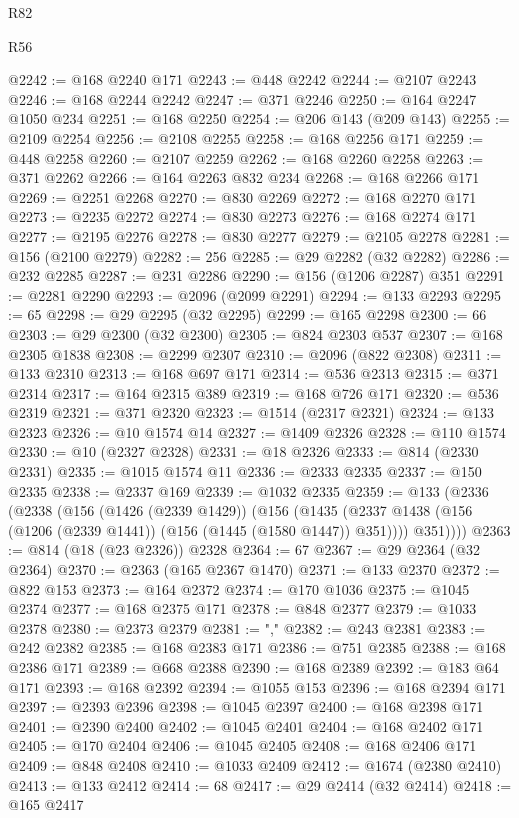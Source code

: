 \begin{lexlean}{R82}
\begin{lexlean}{R56}
\begin{coremodule}
{{{{{{{{{{{{{{{{{{{{{{{{{{{{{{{{{{{{{{{{{{{{{{{{{{{{{{{{{{{{{{{{{{{{{{{{{{{{{{{{{{{{{{{{{{{{{{{{{{{{{{{{{{{{{{{{{{{{{{{{{{{{{{{{{{{{{{{{{{{{{{{{{{{{{{{{{{{{{{{{{{{{{{{{{{{{{{{{{{{{{{{{{{{{{{{{{{{{{{{{{{{{{{{{{{{@2242 := @168 @2240 @171
@2243 := @448 @2242
@2244 := @2107 @2243
@2246 := @168 @2244 @2242
@2247 := @371 @2246
@2250 := @164 @2247 @1050 @234
@2251 := @168 @2250
@2254 := @206 @143 (@209 @143)
@2255 := @2109 @2254
@2256 := @2108 @2255
@2258 := @168 @2256 @171
@2259 := @448 @2258
@2260 := @2107 @2259
@2262 := @168 @2260 @2258
@2263 := @371 @2262
@2266 := @164 @2263 @832 @234
@2268 := @168 @2266 @171
@2269 := @2251 @2268
@2270 := @830 @2269
@2272 := @168 @2270 @171
@2273 := @2235 @2272
@2274 := @830 @2273
@2276 := @168 @2274 @171
@2277 := @2195 @2276
@2278 := @830 @2277
@2279 := @2105 @2278
@2281 := @156 (@2100 @2279)
@2282 := 256
@2285 := @29 @2282 (@32 @2282)
@2286 := @232 @2285
@2287 := @231 @2286
@2290 := @156 (@1206 @2287) @351
@2291 := @2281 @2290
@2293 := @2096 (@2099 @2291)
@2294 := @133 @2293
@2295 := 65
@2298 := @29 @2295 (@32 @2295)
@2299 := @165 @2298
@2300 := 66
@2303 := @29 @2300 (@32 @2300)
@2305 := @824 @2303 @537
@2307 := @168 @2305 @1838
@2308 := @2299 @2307
@2310 := @2096 (@822 @2308)
@2311 := @133 @2310
@2313 := @168 @697 @171
@2314 := @536 @2313
@2315 := @371 @2314
@2317 := @164 @2315 @389
@2319 := @168 @726 @171
@2320 := @536 @2319
@2321 := @371 @2320
@2323 := @1514 (@2317 @2321)
@2324 := @133 @2323
@2326 := @10 @1574 @14
@2327 := @1409 @2326
@2328 := @110 @1574
@2330 := @10 (@2327 @2328)
@2331 := @18 @2326
@2333 := @814 (@2330 @2331)
@2335 := @1015 @1574 @11
@2336 := @2333 @2335
@2337 := @150 @2335
@2338 := @2337 @169
@2339 := @1032 @2335
@2359 := @133
    (@2336
      (@2338
        (@156
          (@1426 (@2339 @1429))
          (@156
            (@1435 (@2337 @1438 (@156 (@1206 (@2339 @1441)) (@156 (@1445 (@1580 @1447)) @351))))
            @351))))
@2363 := @814 (@18 (@23 @2326)) @2328
@2364 := 67
@2367 := @29 @2364 (@32 @2364)
@2370 := @2363 (@165 @2367 @1470)
@2371 := @133 @2370
@2372 := @822 @153
@2373 := @164 @2372
@2374 := @170 @1036
@2375 := @1045 @2374
@2377 := @168 @2375 @171
@2378 := @848 @2377
@2379 := @1033 @2378
@2380 := @2373 @2379
@2381 := ","
@2382 := @243 @2381
@2383 := @242 @2382
@2385 := @168 @2383 @171
@2386 := @751 @2385
@2388 := @168 @2386 @171
@2389 := @668 @2388
@2390 := @168 @2389
@2392 := @183 @64 @171
@2393 := @168 @2392
@2394 := @1055 @153
@2396 := @168 @2394 @171
@2397 := @2393 @2396
@2398 := @1045 @2397
@2400 := @168 @2398 @171
@2401 := @2390 @2400
@2402 := @1045 @2401
@2404 := @168 @2402 @171
@2405 := @170 @2404
@2406 := @1045 @2405
@2408 := @168 @2406 @171
@2409 := @848 @2408
@2410 := @1033 @2409
@2412 := @1674 (@2380 @2410)
@2413 := @133 @2412
@2414 := 68
@2417 := @29 @2414 (@32 @2414)
@2418 := @165 @2417
}}}}}}}}}}}}}}}}}}}}}}}}}}}}}}}}}}}}}}}}}}}}}}}}}}}}}}}}}}}}}}}}}}}}}}}}}}}}}}}}}}}}}}}}}}}}}}}}}}}}}}}}}}}}}}}}}}}}}}}}}}}}}}}}}}}}}}}}}}}}}}}}}}}}}}}}}}}}}}}}}}}}}}}}}}}}}}}}}}}}}}}}}}}}}}}}}}}}}}}}}}}}}}}}}}}
\end{coremodule}
\end{lexlean}
\end{lexlean}
